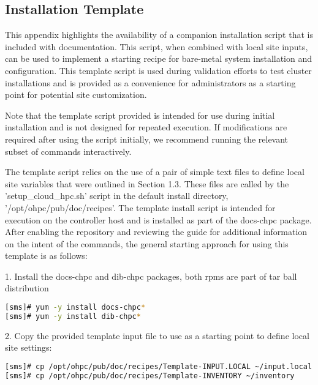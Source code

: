 \renewcommand\thesubsection{\Alph{subsection}}
\subsection{Installation Template}

This appendix highlights the availability of a companion installation script that is included with documentation. This script, when combined with local site inputs, can be used to implement a starting
recipe for bare-metal system installation and configuration. This template script is used during validation efforts to test cluster installations and is provided as a convenience for administrators as a starting point for potential site customization.
\begin{center}
	\begin{tcolorbox}[]
		\small
Note that the template script provided is intended for use during initial installation and is not designed for
repeated execution. If modifications are required after using the script initially, we recommend running the
relevant subset of commands interactively.
\end{tcolorbox}
\end{center}
The template script relies on the use of a pair of simple text files to define local site variables that were outlined
in Section 1.3. These files are called by the 'setup\_cloud\_hpc.sh' script in the default install directory, '/opt/ohpc/pub/doc/recipes'.
The template install script is intended for
execution on the controller host and is installed as part of the docs-chpc package. After enabling the repository and reviewing the guide for additional information on the intent of the commands, the general starting approach for using this template
is as follows:


1. Install the docs-chpc and dib-chpc packages, both rpms are part of tar ball distribution

\begin{lstlisting}[language=bash,keywords={},upquote=true]
[sms]# yum -y install docs-chpc*
[sms]# yum -y install dib-chpc*
\end{lstlisting}

2. Copy the provided template input file to use as a starting point to define local site settings:

\begin{lstlisting}[language=bash,keywords={},upquote=true]
[sms]# cp /opt/ohpc/pub/doc/recipes/Template-INPUT.LOCAL ~/input.local
[sms]# cp /opt/ohpc/pub/doc/recipes/Template-INVENTORY ~/inventory
\end{lstlisting}

